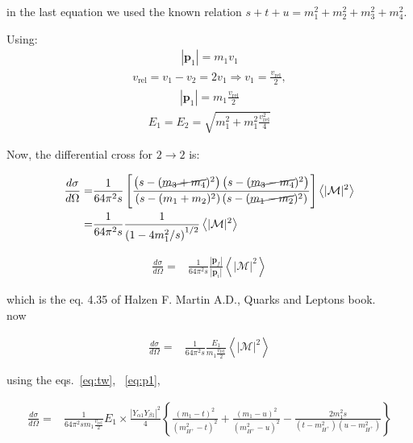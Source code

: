 \documentclass[12pt,letterpaper]{article}
\begin{document}
in the last equation we used the known relation $s+t+u=m_1^2+m_2^2+m_3^2+m_4^2 $.

Using:
\begin{align}
  |\mathbf{p}_1|=m_1v_1
\end{align}
\begin{align*}
  v_{\text{rel}}=v_1-v_2=2v_1 \Rightarrow   v_1=\frac{v_{\text{rel}}}{2} ,
\end{align*}
\begin{align}
\label{eq:p1}
  |\mathbf{p}_1|=m_1 \frac{v_{\text{rel}}}{2}
\end{align}
\begin{align}
\label{eq:energy}
  E_1=E_2=\sqrt{m_1^2+m_1^2 \frac{v_{\text{rel}}^2}{4}}
\end{align}

Now, the differential cross for $2\to 2$ is:

\begin{align}
  \frac{d\sigma}{d\Omega}=&\frac{1}{64\pi^2 s}
\left[ \frac{\left(s-(\cancel{m_3+m_4})^2  \right)\left(s-(\cancel{m_3-m_4})^2  \right)}{\left(s-(m_1+m_2)^2  \right)\left(s-(\cancel{m_1-m_2})^2  \right)} \right]\left\langle |\mathcal{M}|^2 \right\rangle\nonumber\\
=&\frac{1}{64\pi^2 s}\frac{1}{\left( 1-4 m_1^2/s \right)^{1/2}}
\left\langle |\mathcal{M}|^2 \right\rangle
\end{align}

\begin{align}
  \frac{d\sigma}{d\Omega}
=&\frac{1}{64\pi^2 s}\frac{|\mathbf{p}_f|}{|\mathbf{p}_{i}|}\left\langle |\mathcal{M}|^2 \right\rangle 
\end{align}

which is the eq. 4.35 of Halzen F. Martin A.D., Quarks and Leptons book.\\

now 

\begin{align}
  \frac{d\sigma}{d\Omega}
=&\frac{1}{64\pi^2 s}\frac{E_1}{m_1 \frac{v_{\text{rel}}}{2}}\left\langle |\mathcal{M}|^2 \right\rangle 
\end{align}

using the eqs.~\eqref{eq:tw},  ~\eqref{eq:p1},


\begin{align}
  \frac{d\sigma}{d\Omega}=&\frac{1}{64\pi^2 s m_1 \frac{v_{\text{rel}}}{2}}E_1 \times \frac{|Y_{\alpha 1}Y_{\beta 1}|^2}{4} \left\{ 
\frac{\left(m_1-t  \right)^2}{\left( m_{H^+}^2-t \right)^2}+
\frac{\left(m_1-u  \right)^2}{\left( m_{H^+}^2-u \right)^2}-
\frac{2 m_1^2 s}{\left( t-m_{H^+}^2 \right)\left( u-m_{H^+}^2 \right)}
 \right\}
\end{align}
\end{document}
